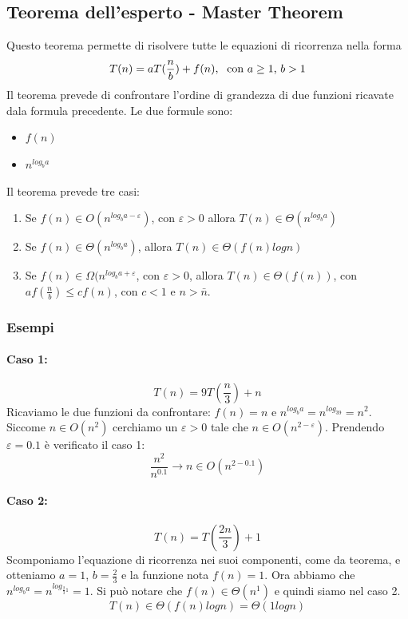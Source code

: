 \documentclass[a4paper,12pt,twoside]{report}
\begin{document}
\subsection{Teorema dell'esperto - Master Theorem}
Questo teorema permette di risolvere tutte le equazioni di ricorrenza nella forma
\[ T(n) = aT(\frac{n}{b}) + f(n), \thickspace \text{ con $a \ge 1$, $b > 1$} \]
Il teorema prevede di confrontare l'ordine di grandezza di due funzioni ricavate dala formula precedente. Le due formule sono: 
\begin{itemize}
\item $f(n)$
\item $n^{log_ba}$
\end{itemize}
Il teorema prevede tre casi:
\begin{enumerate}
\item Se $f(n) \in O(n^{log_ba - \varepsilon})$, con $\varepsilon > 0$ allora $T(n) \in \Theta(n^{log_ba})$
\item Se $f(n) \in \Theta(n^{log_ba})$, allora $T(n) \in \Theta(f(n) log n)$
\item Se $f(n) \in \Omega(n^{log_ba + \varepsilon}$, con $\varepsilon > 0$, allora $T(n) \in \Theta(f(n))$, con $a f(\frac{n}{b}) \le c f(n)$, con $c < 1$ e $n > \bar{n}$.
\end{enumerate}
\subsubsection{Esempi}
\paragraph{Caso 1:} 
\[T(n) = 9T(\frac{n}{3}) + n\]
Ricaviamo le due funzioni da confrontare: $f(n) = n$ e $n^{log_ba} = n^{log_39} = n^{2}$. Siccome $n \in O(n^2)$ cerchiamo un $\varepsilon > 0$ tale che $n \in O(n^{2-\varepsilon})$. Prendendo $\varepsilon = 0.1$ \`{e} verificato il caso 1:
\[ \frac{n^2}{n^{0.1}} \to n \in O(n^{2-0.1})\]
\paragraph{Caso 2:}
\[ T(n) = T(\frac{2n}{3}) + 1 \]
Scomponiamo l'equazione di ricorrenza nei suoi componenti, come da teorema, e otteniamo $a = 1$, $b = \frac{2}{3}$ e la funzione nota $f(n) = 1$. 
Ora abbiamo che $n^{log_ba} = n^{log_{\frac{2}{3}1}} = 1$. Si pu\`{o} notare che $f(n) \in \Theta(n^1)$ e quindi siamo nel caso 2. 
\[ T(n) \in \Theta(f(n)logn) = \Theta(1logn)\]
\end{document}

